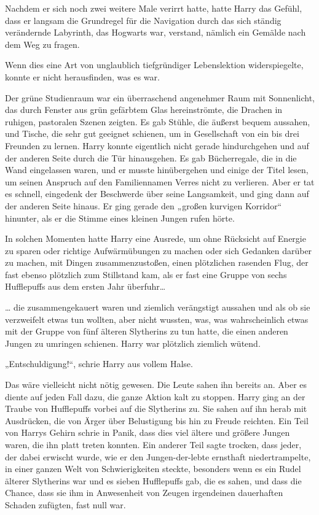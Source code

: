 {Nachdem er sich noch zwei weitere Male verirrt hatte, hatte Harry das Gefühl, dass er langsam die Grundregel für die Navigation durch das sich ständig verändernde Labyrinth, das Hogwarts war, verstand, nämlich ein Gemälde nach dem Weg zu fragen.

Wenn dies eine Art von unglaublich tiefgründiger Lebenslektion widerspiegelte, konnte er nicht herausfinden, was es war.

Der grüne Studienraum war ein überraschend angenehmer Raum mit Sonnenlicht, das durch Fenster aus grün gefärbtem Glas hereinströmte, die Drachen in ruhigen, pastoralen Szenen zeigten. Es gab Stühle, die äußerst bequem aussahen, und Tische, die sehr gut geeignet schienen, um in Gesellschaft von ein bis drei Freunden zu lernen. Harry konnte eigentlich nicht gerade hindurchgehen und auf der anderen Seite durch die Tür hinausgehen. Es gab Bücherregale, die in die Wand eingelassen waren, und er musste hinübergehen und einige der Titel lesen, um seinen Anspruch auf den Familiennamen Verres nicht zu verlieren. Aber er tat es schnell, eingedenk der Beschwerde über seine Langsamkeit, und ging dann auf der anderen Seite hinaus. Er ging gerade den „großen kurvigen Korridor“ hinunter, als er die Stimme eines kleinen Jungen rufen hörte.

In solchen Momenten hatte Harry eine Ausrede, um ohne Rücksicht auf Energie zu sparen oder richtige Aufwärmübungen zu machen oder sich Gedanken darüber zu machen, mit Dingen zusammenzustoßen, einen plötzlichen rasenden Flug, der fast ebenso plötzlich zum Stillstand kam, als er fast eine Gruppe von sechs Hufflepuffs aus dem ersten Jahr überfuhr…

… die zusammengekauert waren und ziemlich verängstigt aussahen und als ob sie verzweifelt etwas tun wollten, aber nicht wussten, was, was wahrscheinlich etwas mit der Gruppe von fünf älteren Slytherins zu tun hatte, die einen anderen Jungen zu umringen schienen. Harry war plötzlich ziemlich wütend.

„Entschuldigung!“, schrie Harry aus vollem Halse.

Das wäre vielleicht nicht nötig gewesen. Die Leute sahen ihn bereits an. Aber es diente auf jeden Fall dazu, die ganze Aktion kalt zu stoppen. Harry ging an der Traube von Hufflepuffs vorbei auf die Slytherins zu. Sie sahen auf ihn herab mit Ausdrücken, die von Ärger über Belustigung bis hin zu Freude reichten. Ein Teil von Harrys Gehirn schrie in Panik, dass dies viel ältere und größere Jungen waren, die ihn platt treten konnten. Ein anderer Teil sagte trocken, dass jeder, der dabei erwischt wurde, wie er den Jungen-der-lebte ernsthaft niedertrampelte, in einer ganzen Welt von Schwierigkeiten steckte, besonders wenn es ein Rudel älterer Slytherins war und es sieben Hufflepuffs gab, die es sahen, und dass die Chance, dass sie ihm in Anwesenheit von Zeugen irgendeinen dauerhaften Schaden zufügten, fast null war.

}
